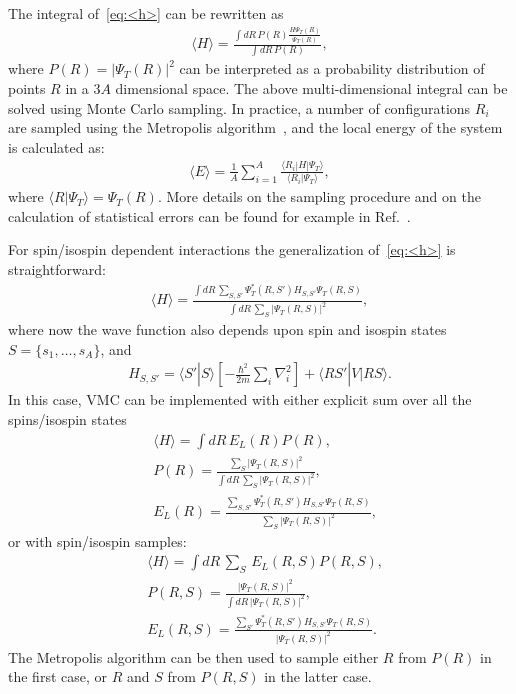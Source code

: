 \documentclass[aps,prc,twocolumn,superscriptaddress,floatfix]{revtex4-1}
\newcommand{\red}[1]{\protect\textcolor{red}{#1}}
\begin{document}
The integral of~\cref{eq:<h>} can be rewritten as
\begin{align}
\langle H\rangle=\frac{\displaystyle\int dR\,P(R) \frac{H\Psi_T(R)}{\Psi_T(R)}}{\displaystyle\int dR\,P(R)} ,
\end{align}
where $P(R)=|\Psi_T(R)|^2$ can be interpreted as a probability distribution of points $R$ in a $3A$ 
dimensional space.
The above multi-dimensional integral can be solved using Monte Carlo sampling.
In practice, a number of configurations $R_i$ are sampled using the Metropolis algorithm~\cite{Metropolis:1953}, 
and the local energy of the system is calculated as:
\begin{align}
\langle E\rangle=\frac{1}{A}\sum_{i=1}^A \frac{\langle R_i|H|\Psi_T\rangle}{\langle R_i|\Psi_T\rangle} ,
\end{align}
where $\langle R|\Psi_T\rangle=\Psi_T(R)$.
More details on the sampling procedure and on the calculation of statistical errors can be found 
for example in Ref.~\red{\cite{??}}.

For spin/isospin dependent interactions the generalization of~\cref{eq:<h>} is straightforward:
\begin{align}
\langle H\rangle=\frac{\displaystyle\int dR\,\sum_{S,S'}\Psi_T^*(R,S')H_{S,S'}\Psi_T(R,S)}
{\displaystyle\int dR\,\sum_S|\Psi_T(R,S)|^2} ,
\end{align}
where now the wave function also depends upon spin and isospin states $S=\{s_1,\dots,s_A\}$, and
\begin{align}
H_{S,S'}=\langle S'|S\rangle\left[-\frac{\hbar^2}{2m}\sum_i\nabla_i^2\right]+\langle RS'|V|RS\rangle .
\end{align}
In this case, VMC can be implemented with either explicit sum over all the spins/isospin states
\begin{align}
&\langle H\rangle=\displaystyle\int dR\,E_L(R)P(R) ,\nonumber \\
&P(R)=\frac{\sum_S|\Psi_T(R,S)|^2}{\displaystyle\int dR\,\sum_S|\Psi_T(R,S)|^2} ,\nonumber \\
&E_L(R)=\frac{\sum_{S,S'}\Psi_T^*(R,S')H_{S,S'}\Psi_T(R,S)}{\sum_S|\Psi_T(R,S)|^2} ,
\end{align}
or with spin/isospin samples:
\begin{align}
&\langle H\rangle=\displaystyle\int dR\,\sum_S\,E_L(R,S)P(R,S) ,\nonumber \\
&P(R,S)=\frac{|\Psi_T(R,S)|^2}{\displaystyle\int dR\,|\Psi_T(R,S)|^2} ,\nonumber \\
&E_L(R,S)=\frac{\sum_{S'}\Psi_T^*(R,S')H_{S,S'}\Psi_T(R,S)}{|\Psi_T(R,S)|^2} .
\end{align}
The Metropolis algorithm can be then used to sample either $R$ from $P(R)$ in the first case, 
or $R$ and $S$ from $P(R,S)$ in the latter case.
\end{document}
